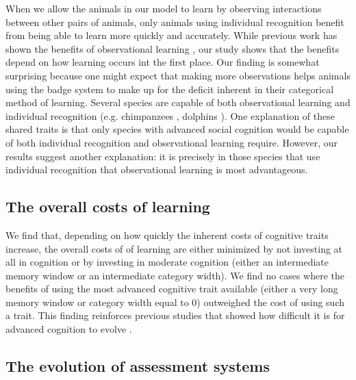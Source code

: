 When we allow the animals in our model to learn by observing interactions between other pairs of animals, only animals using individual recognition benefit from being able to learn more quickly and accurately. While previous work has shown the benefits of observational learning \citep{Freeman:1985kl,Holekamp:1991nx,Schaik:2011oq}, our study shows that the benefits depend on how learning occurs int the first place. Our finding is somewhat surprising because one might expect that making more observations helps animals using the badge system to make up for the deficit inherent in their categorical method of learning. Several species are capable of both observational learning and individual recognition (e.g. chimpanzees \citep{Parr:2000hc,Hopper:2008bh}, dolphins \citep{Sayigh:1999bs,Krutzen:2005ij}). One explanation of these shared traits is that only species with advanced social cognition would be capable of both individual recognition and observational learning require. However, our results suggest another explanation: it is precisely in those species that use individual recognition that observational learning is most advantageous.

\subsection*{The overall costs of learning} %
We find that, depending on how quickly the inherent costs of cognitive traits increase, the overall costs of of learning are either minimized by not investing at all in cognition or by investing in moderate cognition (either an intermediate memory window or an intermediate category width). We find no cases where the benefits of using the most advanced cognitive trait available (either a very long memory window or category width equal to $0$) outweighed the cost of using such a trait. This finding reinforces previous studies that showed how difficult it is for advanced cognition to evolve \citep{Kerr:2003vn}.


\subsection*{The evolution of assessment systems} %

